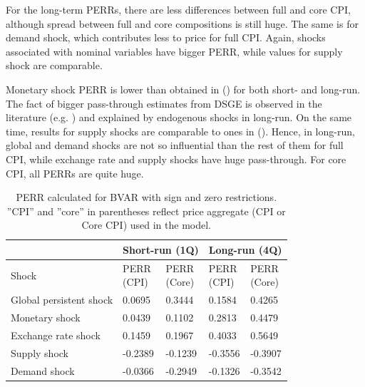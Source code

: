 \documentclass[12pt, a4paper]{extarticle}
\begin{document}
For the long-term PERRs, there are less differences between full and core CPI, although spread between full and core compositions is still huge. The same is for demand shock, which contributes less to price for full CPI. Again, shocks associated with nominal variables have bigger PERR, while values for supply shock are comparable.

Monetary shock PERR is lower than obtained in (\cite[p. 9]{Khotulev2020}) for both short- and long-run. The fact of bigger pass-through estimates from DSGE is observed in the literature (e.g. \cite{Comunale2020}) and explained by endogenous shocks in long-run. On the same time, results for supply shocks are comparable to ones in (\cite{Forbes2018}). Hence, in long-run, global and demand shocks are not so influential than the rest of them for full CPI, while exchange rate and supply shocks have huge pass-through. For core CPI, all PERRs are quite huge. 

\begin{table}[h!!]
	\centering
	\begin{tabular}{@{}lllll@{}}
		\toprule
		& \multicolumn{2}{c}{Short-run (1Q)} & \multicolumn{2}{c}{Long-run (4Q)} \\
		\midrule
		Shock                   & \makecell[c]{PERR\\(CPI)}      & \makecell[c]{PERR\\(Core)}      & \makecell[c]{PERR\\(CPI)}      & \makecell[c]{PERR\\(Core)}     \\
		\midrule
		Global persistent shock & 0.0695          & 0.3444           & 0.1584          & 0.4265          \\
		Monetary shock          & 0.0439          & 0.1102           & 0.2813          & 0.4479          \\
		Exchange rate shock     & 0.1459          & 0.1967           & 0.4033          & 0.5649          \\
		Supply shock            & -0.2389         & -0.1239          & -0.3556         & -0.3907         \\ %
		Demand shock            & -0.0366         & -0.2949          & -0.1326         & -0.3542   \\
		\bottomrule
	\end{tabular}%
	\caption{PERR calculated for BVAR with sign and zero restrictions. ''CPI'' and ''core'' in parentheses reflect price aggregate (CPI or Core CPI) used in the model.}
	\label{tab:perr}
\end{table}
\end{document}
